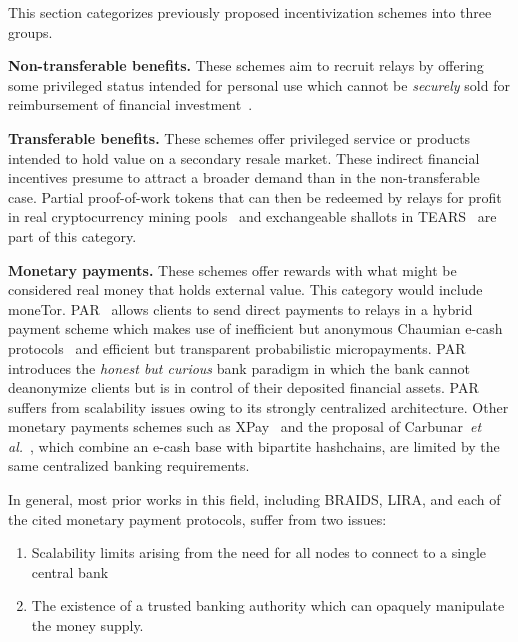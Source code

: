 This section categorizes previously proposed incentivization schemes into three groups.

\medskip\noindent\textbf{Non-transferable benefits.} These schemes aim to recruit relays by offering some privileged status intended for personal use which cannot be \emph{securely} sold for reimbursement of financial investment~\cite{dingledine2010building,jansen2010recruiting, jansen2013lira}.

\medskip\noindent\textbf{Transferable benefits.} These schemes offer privileged service or products intended to hold value on a secondary resale market.
These indirect financial incentives presume to attract a broader demand than in the non-transferable case.
Partial proof-of-work tokens that can then be redeemed by relays for profit in real cryptocurrency mining pools~\cite{biryukov2015proof} and exchangeable shallots in TEARS~\cite{jansen2014onions} are part of this category.

\medskip\noindent\textbf{Monetary payments.} These schemes offer rewards with what might be considered real money that holds external value.
This category would include moneTor.
PAR~\cite{androulaki2008payment} allows clients to send direct payments to relays in a hybrid payment scheme which makes use of inefficient but anonymous Chaumian e-cash protocols~\cite{chaum1988untraceable} and efficient but transparent probabilistic micropayments.
PAR introduces the \emph{honest but curious} bank paradigm in which the bank cannot deanonymize clients but is in control of their deposited financial assets.
PAR suffers from scalability issues owing to its strongly centralized architecture.
Other monetary payments schemes such as XPay~\cite{chen2009xpay} and the proposal of Carbunar~\textit{et al.}~\cite{carbunar2012tipping}, which combine an e-cash base with bipartite hashchains, are limited by the same centralized banking requirements.

In general, most prior works in this field, including BRAIDS, LIRA, and each of the cited monetary payment protocols, suffer from two issues:

\begin{enumerate}
\item Scalability limits arising from the need for all nodes to connect to a single central bank
\item The existence of a trusted banking authority which can opaquely manipulate the money supply.
\end{enumerate}

